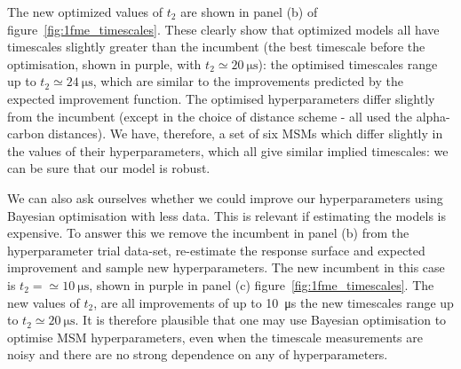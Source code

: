 \documentclass[journal=jacsat,manuscript=article]{achemso}
\begin{document}
The new optimized values of $t_2$ are shown in panel (b) of figure~\ref{fig:1fme_timescales}.  These clearly show that optimized models all have timescales slightly greater than the incumbent (the best timescale before the optimisation, shown in purple, with $t_2 \simeq \SI{20}{\micro\second}$):  the optimised timescales range up to $t_2 \simeq \SI{24}{\micro\second}$, which are similar to the improvements predicted by the expected improvement function. The optimised hyperparameters differ slightly from the incumbent (except in the choice of distance scheme - all used the alpha-carbon distances). We have, therefore, a set of six MSMs which differ slightly in the values of their hyperparameters, which all give similar implied timescales: we can be sure that our model is robust. 

We can also ask ourselves whether we could improve our hyperparameters using Bayesian optimisation with less data. This is relevant if estimating the models is expensive. To answer this we remove the incumbent in panel (b) from the hyperparameter trial data-set, re-estimate the response surface and expected improvement and sample new hyperparameters. The new incumbent in this case is $t_2 = \simeq \SI{10}{\micro\second}$, shown in purple in panel (c) figure~\ref{fig:1fme_timescales}.  The new values of $t_2$,  are all improvements of up to \SI{10}{\micro\second} the new timescales range up to $t_2 \simeq \SI{20}{\micro\second}$. It is therefore plausible that one may use Bayesian optimisation to optimise MSM hyperparameters, even when the timescale measurements are noisy and there are no strong dependence on any of hyperparameters.  
\end{document}
